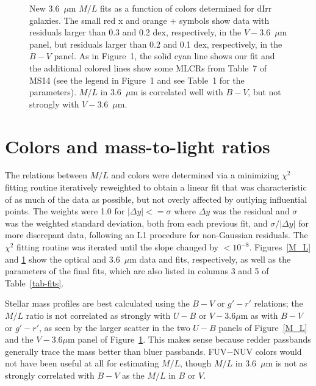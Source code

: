 \documentclass[12pt]{emulateapj}
\begin{document}
\begin{figure}
\caption{New 3.6~$\mu$m $M/L$ fits as a function of colors determined for dIrr galaxies. The small red x and orange + symbols show data with residuals larger than 0.3 and 0.2 dex, respectively, in the $V - $3.6~$\mu$m panel, but residuals larger than 0.2 and 0.1 dex, respectively, in the $B-V$ panel. As in Figure~1, the solid cyan line shows our fit and the additional colored lines show some MLCRs from Table~7 of MS14 (see the legend in Figure~1 and see Table~1 for the parameters). $M/L$ in 3.6~$\mu$m is correlated well with $B-V$, but not strongly with $V - $3.6~$\mu$m. \label{new} }
\end{figure}

\section{Colors and mass-to-light ratios} \label{sec-formula}
The relations between $M/L$ and colors were determined via a minimizing $\chi^2$ fitting routine \citep{NumRec} iteratively reweighted to obtain a linear fit that was characteristic of as much of the data as possible, but not overly affected by outlying influential points.  The weights were 1.0 for $|\Delta y| <= \sigma$ where $\Delta y$ was the residual and $\sigma$ was the weighted standard deviation, both from each previous fit, and $\sigma/|\Delta y|$ for more discrepant data, following an L1 procedure for non-Gaussian residuals.  The $\chi^2$ fitting routine was iterated until the slope changed by $<10^{-8}$.  Figures~\ref{M_L} and \ref{new} show the optical and 3.6~$\mu$m data and fits, respectively, as well as the parameters of the final fits, which are also listed in columns 3 and 5 of Table~\ref{tab-fits}.

Stellar mass profiles are best calculated using the $B-V$ or $g'-r'$ relations; the $M/L$ ratio is not correlated as strongly with $U-B$ or $V-3.6 \mu$m as with $B-V$ or $g'-r'$, as seen by the larger scatter in the two $U-B$ panels of Figure~\ref{M_L} and the $V-3.6 \mu$m panel of Figure~\ref{new}.  This makes sense because redder passbands generally trace the mass better than bluer passbands.  FUV$-$NUV colors would not have been useful at all for estimating $M/L$, though $M/L$ in 3.6~$\mu$m is not as strongly correlated with $B-V$ as the $M/L$ in $B$ or $V$.
\end{document}
